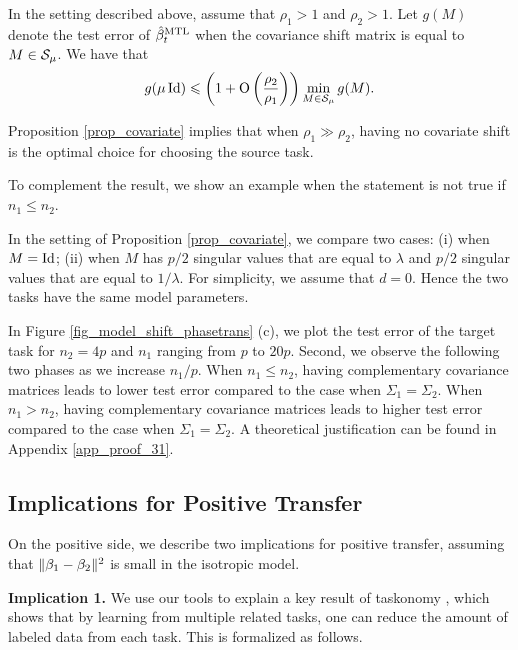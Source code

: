 \begin{proposition}\label{prop_covariate}
	In the setting described above, assume that $\rho_1 > 1$ and $\rho_2>1$.
	Let $g(M)$ denote the test error of $\hat{\beta}_t^{\text{MTL}}$ when the covariance shift matrix is equal to $M\in\mathcal{S}_{\mu}$.
	We have that \[ g(\mu\operatorname{Id}) \leqslant \left({1+ \operatorname{O}\left(\frac{\rho_2}{\rho_1}  \right)}\right) \min_{M\in\mathcal{S}_{\mu}} g(M). \]
\end{proposition}
Proposition \ref{prop_covariate} implies that when $\rho_1\gg \rho_2$, having no covariate shift is the optimal choice for choosing the source task.

\todo{} To complement the result, we show an example when the statement is not true if $n_1 \le n_2$.
\begin{example}\label{ex_complement}
	In the setting of Proposition \ref{prop_covariate}, we compare two cases: (i) when $M = \operatorname{Id}$; (ii) when $M$ has $p/2$ singular values that are equal to $\lambda$ and $p/2$ singular values that are equal to $1 / \lambda$.
	For simplicity, we assume that $d = 0$.
	Hence the two tasks have the same model parameters.

	In Figure \ref{fig_model_shift_phasetrans} (c), we plot the test error of the target task for $n_2 = 4p$ and $n_1$ ranging from $p$ to $20p$.
	Second, we observe the following two phases as we increase $n_1 / p$.
	When $n_1 \le n_2$, having complementary covariance matrices leads to lower test error compared to the case when $\Sigma_1 = \Sigma_2$.
	When $n_1 > n_2$, having complementary covariance matrices leads to higher test error compared to the case when $\Sigma_1 = \Sigma_2$.
	A theoretical justification can be found in Appendix \ref{app_proof_31}.
\end{example}


\subsection{Implications for Positive Transfer}\label{sec_benefit}

On the positive side, we describe two implications for positive transfer, assuming that $\|\beta_1 - \beta_2\|^2$ is small in the isotropic model.

\textbf{Implication 1.}
We use our tools to explain a key result of taskonomy \cite{ZSSGM18}, which shows that by learning from multiple related tasks, one can reduce the amount of labeled data from each task.
This is formalized as follows.

